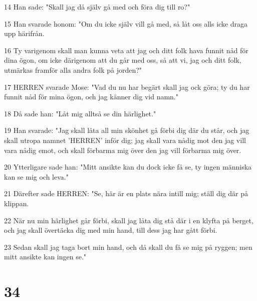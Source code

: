 \par 14 Han sade: "Skall jag då själv gå med och föra dig till ro?"
\par 15 Han svarade honom: "Om du icke själv vill gå med, så låt oss alls icke draga upp härifrån.
\par 16 Ty varigenom skall man kunna veta att jag och ditt folk hava funnit nåd för dina ögon, om icke därigenom att du går med oss, så att vi, jag och ditt folk, utmärkas framför alla andra folk på jorden?"
\par 17 HERREN svarade Mose: "Vad du nu har begärt skall jag ock göra; ty du har funnit nåd för mina ögon, och jag känner dig vid namn."
\par 18 Då sade han: "Låt mig alltså se din härlighet."
\par 19 Han svarade: "Jag skall låta all min skönhet gå förbi dig där du står, och jag skall utropa namnet 'HERREN' inför dig; jag skall vara nådig mot den jag vill vara nådig emot, och skall förbarma mig över den jag vill förbarma mig över.
\par 20 Ytterligare sade han: "Mitt ansikte kan du dock icke få se, ty ingen människa kan se mig och leva."
\par 21 Därefter sade HERREN: "Se, här är en plats nära intill mig; ställ dig där på klippan.
\par 22 När nu min härlighet går förbi, skall jag låta dig stå där i en klyfta på berget, och jag skall övertäcka dig med min hand, till dess jag har gått förbi.
\par 23 Sedan skall jag taga bort min hand, och då skall du få se mig på ryggen; men mitt ansikte kan ingen se."

\chapter{34}

